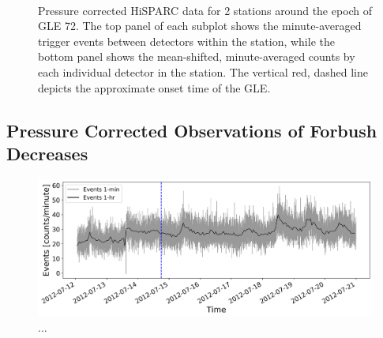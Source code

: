 \begin{figure}[ht]
	\centering
	 \\
	
	
	\caption{Pressure corrected HiSPARC data for 2 stations around the epoch of GLE 72. The top panel of each subplot shows the minute-averaged trigger events between detectors within the station, while the bottom panel shows the mean-shifted, minute-averaged counts by each individual detector in the station. The vertical red, dashed line depicts the approximate onset time of the GLE.}
	\label{fig:GLE_72_Pcorr}
\end{figure}


\subsection{Pressure Corrected Observations of Forbush Decreases}



\begin{figure}[ht]
	\centering
	\includegraphics[width=0.65\columnwidth]{FD_201207_8001_Pcorr.png}
	\caption{...}
	\label{fig:FD_201207_8001_Pcorr}
\end{figure}



